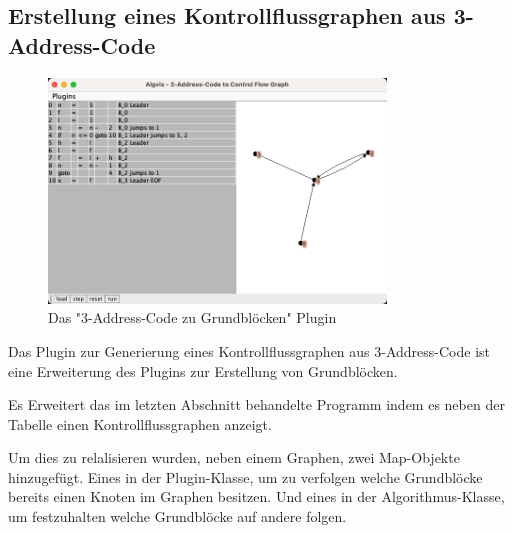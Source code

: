 \subsection{Erstellung eines Kontrollflussgraphen aus 3-Address-Code}
\begin{figure}[h]
  \centering
  \includegraphics[width=0.8\textwidth]{fig/Screenshot_TacToCFG.png}
  \caption{Das "3-Address-Code zu Grundblöcken" Plugin}
  \label{fig:TACtoCFG}
\end{figure}

Das Plugin zur Generierung eines Kontrollflussgraphen aus 3-Address-Code 
ist eine Erweiterung des Plugins zur Erstellung von Grundblöcken.

Es Erweitert das im letzten Abschnitt behandelte Programm indem es
neben der Tabelle einen Kontrollflussgraphen anzeigt.

Um dies zu relalisieren wurden, neben einem Graphen, zwei Map-Objekte hinzugefügt. 
Eines in der Plugin-Klasse, um zu verfolgen welche Grundblöcke bereits einen 
Knoten im Graphen besitzen. Und eines in der Algorithmus-Klasse, um festzuhalten
welche Grundblöcke auf andere folgen.

